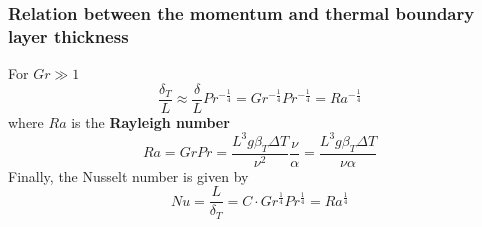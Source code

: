 	\subsubsection{Relation between the momentum and thermal boundary layer thickness}
	For $Gr \gg 1$
	\begin{equation}
		\frac{\delta _T}{L} \approx \frac{\delta }{L}Pr ^{-\frac{1}{4}} = Gr ^{-\frac{1}{4}}Pr ^{-\frac{1}{4}} = Ra ^{-\frac{1}{4}}
	\end{equation}
	where $Ra$ is the \textbf{Rayleigh number} 
	\begin{equation}
		Ra = GrPr = \frac{L^3 g \beta _T \Delta T}{\nu ^2}\frac{ \nu }{\alpha} = \frac{L^3 g \beta _T \Delta T}{\nu \alpha}
	\end{equation}
	Finally, the Nusselt number is given by
	\begin{equation}
		Nu = \frac{L}{\delta _T} =C \cdot Gr ^{\frac{1}{4}}Pr ^{\frac{1}{4}} = Ra ^{\frac{1}{4}}
	\end{equation}